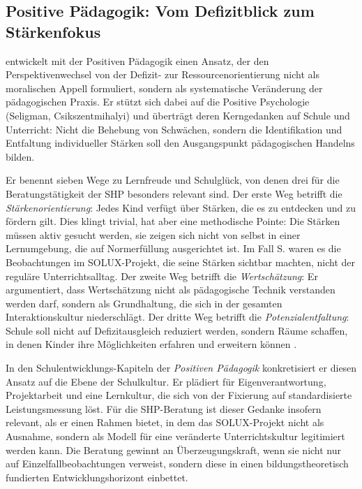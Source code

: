 \documentclass[ngerman, a4paper]{article}
\begin{document}
\subsection{Positive Pädagogik: Vom Defizitblick zum Stärkenfokus}

\textcite{burow2021positive} entwickelt mit der Positiven Pädagogik einen Ansatz, der den
Perspektivenwechsel von der Defizit- zur Ressourcenorientierung nicht als moralischen
Appell formuliert, sondern als systematische Veränderung der pädagogischen Praxis.
Er stützt sich dabei auf die Positive Psychologie (Seligman, Csikszentmihalyi) und
überträgt deren Kerngedanken auf Schule und Unterricht: Nicht die Behebung von
Schwächen, sondern die Identifikation und Entfaltung individueller Stärken soll den
Ausgangspunkt pädagogischen Handelns bilden.

Er benennt sieben Wege zu Lernfreude und Schulglück, von denen drei für die
Beratungstätigkeit der SHP besonders relevant sind. Der erste Weg betrifft die
\textit{Stärkenorientierung}: Jedes Kind verfügt über Stärken, die es zu entdecken
und zu fördern gilt. Dies klingt trivial, hat aber eine methodische Pointe: Die
Stärken müssen aktiv gesucht werden, sie zeigen sich nicht von selbst in einer
Lernumgebung, die auf Normerfüllung ausgerichtet ist. Im Fall S. waren es die
Beobachtungen im SOLUX-Projekt, die seine Stärken sichtbar machten, nicht der
reguläre Unterrichtsalltag. Der zweite Weg betrifft die \textit{Wertschätzung}:
Er argumentiert, dass Wertschätzung nicht als pädagogische Technik verstanden
werden darf, sondern als Grundhaltung, die sich in der gesamten Interaktionskultur
niederschlägt. Der dritte Weg betrifft die \textit{Potenzialentfaltung}: Schule soll
nicht auf Defizitausgleich reduziert werden, sondern Räume schaffen, in denen
Kinder ihre Möglichkeiten erfahren und erweitern können
\parencite{burow2021positive}.

In den Schulentwicklungs-Kapiteln der \textit{Positiven Pädagogik} konkretisiert
er diesen Ansatz auf die Ebene der Schulkultur. Er plädiert für
Eigenverantwortung, Projektarbeit und eine Lernkultur, die sich von der
Fixierung auf standardisierte Leistungsmessung löst. Für die SHP-Beratung
ist dieser Gedanke insofern relevant, als er einen Rahmen bietet, in dem
das SOLUX-Projekt nicht als Ausnahme, sondern als Modell für eine
veränderte Unterrichtskultur legitimiert werden kann. Die Beratung gewinnt
an Überzeugungskraft, wenn sie nicht nur auf Einzelfallbeobachtungen
verweist, sondern diese in einen bildungstheoretisch fundierten
Entwicklungshorizont einbettet.
\end{document}
